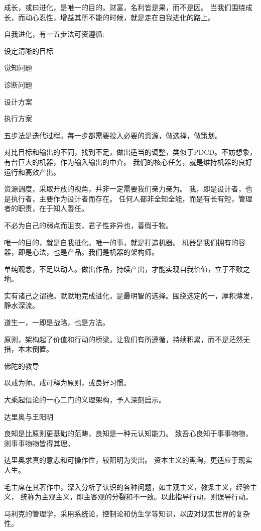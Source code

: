 成长，或曰进化，是唯一的目的。财富，名利皆是果，而不是因。
当我们围绕成长，而动心忍性，增益其所不能的时候，就是走在自我进化的路上。

自我进化，有一五步法可资遵循:
\begin{enumbox}
\item 设定清晰的目标
\item 觉知问题
\item 诊断问题
\item 设计方案
\item 执行方案
\end{enumbox}

五步法是迭代过程。每一步都需要投入必要的资源，做选择，做策划。

对比目标和输出的不同，找到不足，做出适当的调整，类似于PDCD。不妨想象，有台巨大的机器，作为输入输出的中介。
我们的核心任务，就是维持机器的良好运行和高效产出。

资源调度，采取开放的视角，并非一定需要我们亲力亲为。
我，即是设计者，也是执行者，主要作为设计者而存在。
任何人都非全知全能，而是有长有短，管理者的职责，在于知人善任。

不必为自己的弱点而沮丧，君子性非异也，善假于物。

唯一的目的，就是自我进化。唯一的事，就是打造机器。
机器是我们拥有的容器，即是心法，也是产品。我们是机器的架构师。

单纯观念，不足以动人。做出作品，持续产出，才能实现自我价值，立于不败之地。

实有诸己之谓德。默默地完成进化，是最明智的选择。围绕选定的一，厚积薄发，静水深流。

道生一，一即是战略，也是方法。

原则，架构起了价值和行动的桥梁。让我们有所遵循，持续积累，而不是茫然无措，本末倒置。

佛陀的教导

以戒为师。戒可释为原则，或良好习惯。

大乘起信论的一心二门的义理架构，予人深刻启示。

达里奥与王阳明

良知是比原则更基础的范畴，良知是一种元认知能力。
致吾心良知于事事物物，则事事物物皆得其理。

达里奥求真的意志和可操作性，较阳明为突出。
资本主义的熏陶，更适应于现实人生。

毛主席在其著作中，深入分析了认识的各种问题，如主观主义，教条主义，经验主义，
统称为主观主义，即主客观的分裂和不一致。以此指导行动，则误导行动。

马利克的管理学，采用系统论，控制论和仿生学等知识，以应对现实世界的复杂性。

